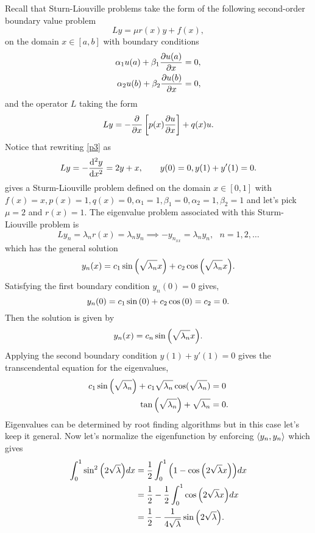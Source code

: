\documentclass[12pt]{report}
\begin{document}
\begin{solution}
    Recall that Sturn-Liouville problems take the form of the following second-order boundary value problem 
    \[ 
        Ly = \mu r(x) y + f(x),
    \]
    on the domain $x \in [a,b]$ with boundary conditions
    \begin{align*}
        \alpha_1 u(a) + \beta_1 \frac{\partial u(a)}{\partial x} &= 0,\\
        \alpha_2 u(b) + \beta_2 \frac{\partial u(b)}{\partial x} &= 0,
    \end{align*}
    and the operator $L$ taking the form
    \[ 
        Ly = -\frac{\partial }{\partial x} \left[ p(x) \frac{\partial u}{\partial x} \right] + q(x)u.
    \]
    Notice that rewriting \ref{p3} as 
    \[ 
        Ly = -\frac{\mathrm{d}^{2} y}{\mathrm{d} x^{2}} = 2y + x, ~~~~~~ y(0) = 0, y(1) + y'(1) = 0.
    \]
    gives a Sturm-Liouville problem defined on the domain $x \in [0, 1]$ with $f(x) = x, p(x) = 1, q(x) = 0, \alpha_1 = 1, \beta_1 = 0, \alpha_2 = 1, \beta_2 = 1$ and let's pick $\mu = 2$ and $r(x) = 1$. The eigenvalue problem associated with this Sturm-Liouville problem is
    \[ 
        Ly_n = \lambda_n r(x) = \lambda_n y_n \implies - y_{n_{xx}} = \lambda_n y_n, ~~~ n = 1, 2, \dots
    \]
    which has the general solution
    \[ 
        y_n(x) = c_1 \sin {\left( \sqrt{\lambda_n} x\right)} + c_2 \cos {\left( \sqrt{\lambda_n} x\right)}.
    \]
    Satisfying the first boundary condition $y_n(0) = 0$ gives,
    \[ 
        y_n(0) = c_1 \sin {\left(0\right)} + c_2 \cos {\left(0\right)} = c_2 = 0.
    \]
    Then the solution is given by
    \[ 
        y_n(x) = c_n \sin {\left( \sqrt{\lambda_n} x\right)}.
    \]
    Applying the second boundary condition $y(1) + y'(1) = 0$ gives the transcendental equation for the eigenvalues,
    \begin{align*}
        c_1 \sin {\left( \sqrt{\lambda_n}\right)} + c_1\sqrt{\lambda_n} \cos(\sqrt{\lambda_n}) &= 0\\
        \tan {\left( \sqrt{\lambda_n}\right)} +\sqrt{\lambda_n} &= 0.\\
    \end{align*}
    Eigenvalues can be determined by root finding algorithms but in this case let's keep it general. Now let's normalize the eigenfunction by enforcing ${\left\langle y_n,y_n\right\rangle}$ which gives
    \begin{align*}
        \int_0^1 \sin^2{\left(2\sqrt{\lambda}\right)}dx &= \frac{1}{2} \int_0^1{\left(1 - \cos{\left(2\sqrt{\lambda}x\right)}\right)}dx\\
        &= \frac{1}{2} - \frac{1}{2}\int_0^1\cos{\left(2\sqrt{\lambda}x\right)}dx\\
        &= \frac{1}{2} - \frac{1}{4\sqrt{\lambda}}\sin{\left(2\sqrt{\lambda}\right)}.
    \end{align*}

\end{solution}
\end{document}

